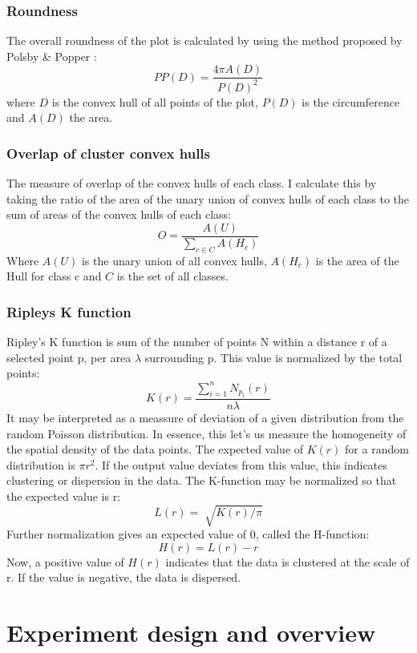 \documentclass[11pt]{article}
\begin{document}
\subsubsection{Roundness}
\label{sec:org7b61201}

The overall roundness of the plot is calculated by using the method proposed by Polsby \& Popper \cite{popper}:
\[PP(D) = \frac{4 \pi A(D)}{P(D)^{2}} \]
where \(D\) is the convex hull of all points of the plot, \(P(D)\) is the circumference and \(A(D)\) the area.
\subsubsection{Overlap of cluster convex hulls}
\label{sec:org274a5d2}

The measure of overlap of the convex hulls of each class. I calculate this by taking the ratio of the area of the unary union of convex hulls of each class to the sum of areas of the convex hulls of each class:
\[ O = \frac{A(U)}{\sum_{c \in C}A(H_{c})} \]
Where \(A(U)\) is the unary union of all convex hulls, \(A(H_{c})\) is the area of the Hull for class c and \(C\) is the set of all classes.
\subsubsection{Ripleys K function}
\label{sec:org533d625}

Ripley's K function is sum of the number of points N within a distance r of a selected point p, per area \(\lambda\) surrounding p. This  value is normalized by the total points:
\[K(r) = \frac{\sum_{i=1}^{n}N_{p_{i}}(r)}{n \lambda}\]
It may be interpreted as a meassure of deviation of a given distribution from the random Poisson distribution. In essence, this let's us measure the homogeneity of the spatial density of the data points. The expected value of \(K(r)\) for a random distribution is \(\pi r^{2}\). If the output value deviates from this value, this indicates clustering or dispersion in the data. The K-function may be normalized so that the expected value is r:
\[L(r) = \sqrt[]{K(r)/\pi}\]
Further normalization gives an expected value of 0, called the H-function:
\[H(r) = L(r) - r\]
Now, a positive value of \(H(r)\) indicates that the data is clustered at the scale of r. If the value is negative, the data is dispersed.

\pagebreak

\section{Experiment design and overview}
\label{sec:orga220b5b}
\end{document}
